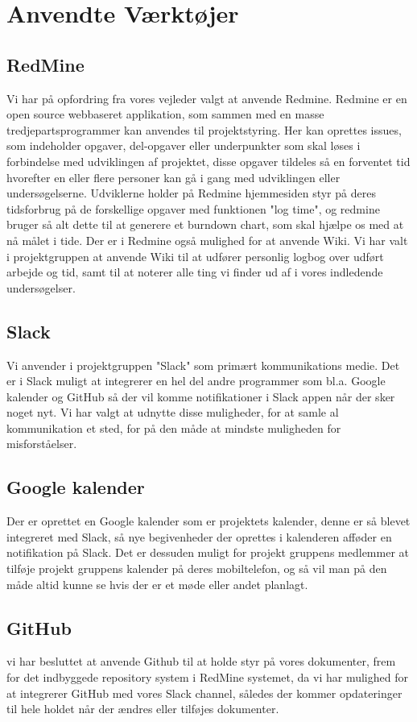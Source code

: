 \chapter{Anvendte Værktøjer}
\section{RedMine}
Vi har på opfordring fra vores vejleder valgt at anvende Redmine. 
Redmine er en open source webbaseret applikation, som sammen med en masse tredjepartsprogrammer kan anvendes til projektstyring. Her kan oprettes issues, som indeholder opgaver, del-opgaver eller underpunkter som skal løses i forbindelse med udviklingen af projektet, disse opgaver tildeles så en forventet tid hvorefter en eller flere personer kan gå i gang med udviklingen eller undersøgelserne. Udviklerne holder på Redmine hjemmesiden styr på deres tidsforbrug på de forskellige opgaver med funktionen "log time", og redmine bruger så alt dette til at generere et burndown chart, som skal hjælpe os med at nå målet i tide. Der er i Redmine også mulighed for at anvende Wiki. Vi har valt i projektgruppen at anvende Wiki til at udfører personlig logbog over udført arbejde og tid, samt til at noterer alle ting vi finder ud af i vores indledende undersøgelser.
\section{Slack}
Vi anvender i projektgruppen "Slack" som primært kommunikations medie. Det er i Slack muligt at integrerer en hel del andre programmer som bl.a. Google kalender og GitHub så der vil komme notifikationer i Slack appen når der sker noget nyt. Vi har valgt at udnytte disse muligheder, for at samle al kommunikation et sted, for på den måde at mindste muligheden for misforståelser.
\section{Google kalender}
Der er oprettet en Google kalender som er projektets kalender, denne er så blevet integreret med Slack, så nye begivenheder der oprettes i kalenderen afføder en notifikation på Slack. Det er dessuden muligt for projekt gruppens medlemmer at tilføje projekt gruppens kalender på deres mobiltelefon, og så vil man på den måde altid kunne se hvis der er et møde eller andet planlagt.
\section{GitHub}
vi har besluttet at anvende Github til at holde styr på vores dokumenter, frem for det indbyggede repository system i RedMine systemet, da vi har mulighed for at integrerer GitHub med vores Slack channel, således der kommer opdateringer til hele holdet når der ændres eller tilføjes dokumenter.
